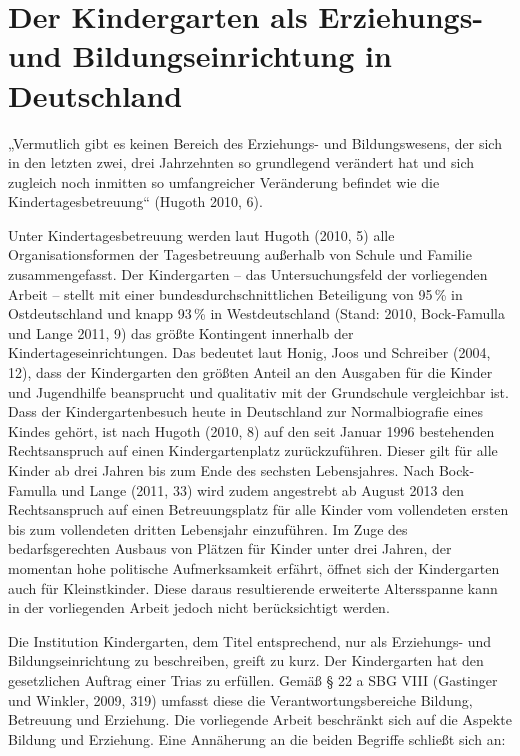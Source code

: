 \chapter{Der Kindergarten als Erziehungs- und Bildungseinrichtung in Deutschland}


„Vermutlich gibt es keinen Bereich des Erziehungs- und Bildungswesens, der sich in den letzten zwei, drei Jahrzehnten so grundlegend verändert hat und sich zugleich noch inmitten so umfangreicher Veränderung befindet wie die Kindertagesbetreuung“ (Hugoth 2010, 6).

Unter Kindertagesbetreuung werden laut Hugoth (2010, 5) alle Organisationsformen der Tagesbetreuung außerhalb von Schule und Familie zusammengefasst. Der Kindergarten -- das Untersuchungsfeld der vorliegenden Arbeit -- stellt mit einer bundesdurchschnittlichen Beteiligung von 95\,\% in Ostdeutschland und knapp 93\,\% in Westdeutschland (Stand: 2010, Bock-Famulla und Lange 2011, 9) das größte Kontingent innerhalb der Kindertageseinrichtungen. Das bedeutet laut Honig, Joos  und Schreiber (2004, 12), dass der Kindergarten den größten Anteil an den Ausgaben für die Kinder und Jugendhilfe beansprucht und qualitativ mit der Grundschule vergleichbar ist. Dass der Kindergartenbesuch heute in Deutschland zur Normalbiografie eines Kindes gehört, ist nach Hugoth (2010, 8) auf den seit Januar 1996 bestehenden Rechtsanspruch auf einen Kindergartenplatz zurückzuführen. Dieser gilt für alle Kinder ab drei Jahren bis zum Ende des sechsten Lebensjahres. Nach Bock-Famulla und Lange (2011, 33) wird zudem angestrebt ab August 2013 den Rechtsanspruch auf einen Betreuungsplatz für alle Kinder vom vollendeten ersten bis zum vollendeten dritten Lebensjahr einzuführen. Im Zuge des bedarfsgerechten Ausbaus von Plätzen für Kinder unter drei Jahren, der momentan hohe politische Aufmerksamkeit erfährt, öffnet sich der Kindergarten auch für Kleinstkinder. Diese daraus resultierende erweiterte Altersspanne kann in der vorliegenden Arbeit jedoch nicht berücksichtigt werden.

Die Institution Kindergarten, dem Titel entsprechend, nur als Erziehungs- und Bildungseinrichtung zu beschreiben, greift zu kurz. Der Kindergarten hat den gesetzlichen Auftrag einer Trias zu erfüllen. Gemäß § 22 a SBG VIII (Gastinger und Winkler, 2009, 319) umfasst diese die Verantwortungsbereiche Bildung, Betreuung und Erziehung. Die vorliegende Arbeit beschränkt sich auf die Aspekte Bildung und Erziehung. 
Eine Annäherung an die beiden Begriffe schließt sich an: 

